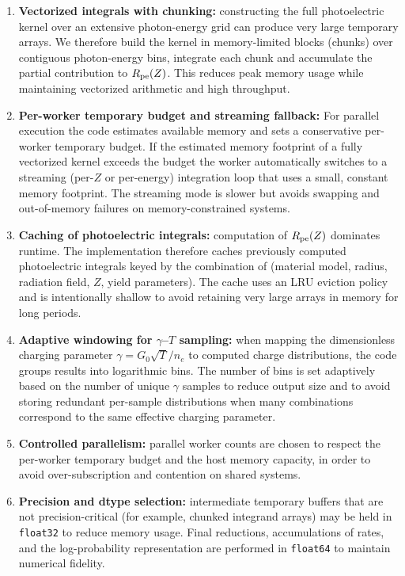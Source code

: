 \documentclass{article}
\begin{document}
\begin{enumerate}
  \item \textbf{Vectorized integrals with chunking:} constructing the full
    photoelectric kernel over an extensive photon-energy grid can produce very
    large temporary arrays. We therefore build the kernel in memory-limited
    blocks (chunks) over contiguous photon-energy bins, integrate each chunk
    and accumulate the partial contribution to $R_{\rm pe}(Z)$. This reduces
    peak memory usage while maintaining vectorized arithmetic and high
    throughput.

  \item \textbf{Per-worker temporary budget and streaming fallback:}
    For parallel execution the code estimates available memory and sets a
    conservative per-worker temporary budget. If the estimated memory
    footprint of a fully vectorized kernel exceeds the budget the worker
    automatically switches to a streaming (per-$Z$ or per-energy) integration
    loop that uses a small, constant memory footprint. The streaming mode is
    slower but avoids swapping and out-of-memory failures on memory-constrained
    systems.

  \item \textbf{Caching of photoelectric integrals:} computation of
    $R_{\rm pe}(Z)$ dominates runtime. The implementation therefore caches
    previously computed photoelectric integrals keyed by the combination of
    (material model, radius, radiation field, $Z$, yield parameters). The
    cache uses an LRU eviction policy and is intentionally shallow to avoid
    retaining very large arrays in memory for long periods.

  \item \textbf{Adaptive windowing for $\gamma$–$T$ sampling:} when
    mapping the dimensionless charging parameter $\gamma = G_0\sqrt{T}/n_e$ to
    computed charge distributions, the code groups results into logarithmic
    bins. The number of bins is set adaptively based on the number of unique
    $\gamma$ samples to reduce output size and to avoid storing redundant
    per-sample distributions when many combinations correspond to the same
    effective charging parameter.

  \item \textbf{Controlled parallelism:} parallel worker counts are chosen to
    respect the per-worker temporary budget and the host memory capacity, in
    order to avoid over-subscription and contention on shared systems.

  \item \textbf{Precision and dtype selection:} intermediate temporary
    buffers that are not precision-critical (for example, chunked integrand
    arrays) may be held in \texttt{float32} to reduce memory usage. Final
    reductions, accumulations of rates, and the log-probability representation
    are performed in \texttt{float64} to maintain numerical fidelity.

\end{enumerate}
\end{document}

